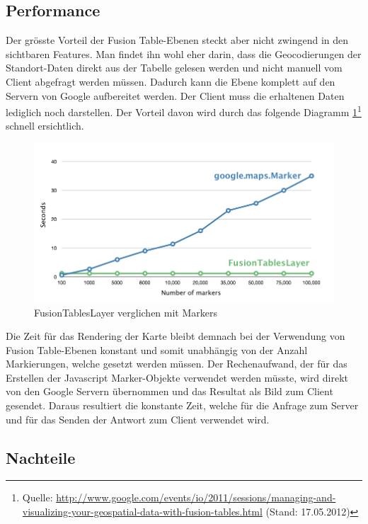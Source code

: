\subsection{Performance}
Der grösste Vorteil der Fusion Table-Ebenen steckt aber nicht zwingend in den sichtbaren Features. Man findet ihn wohl eher darin, dass die Geocodierungen der Standort-Daten direkt aus der Tabelle gelesen werden und nicht manuell vom Client abgefragt werden müssen. Dadurch kann die Ebene komplett auf den Servern von Google aufbereitet werden. Der Client muss die erhaltenen Daten lediglich noch darstellen. Der Vorteil davon wird durch das folgende Diagramm \ref{fusiontableslayer-compare_markers}\footnote{Quelle: \url{http://www.google.com/events/io/2011/sessions/managing-and-visualizing-your-geospatial-data-with-fusion-tables.html} (Stand: 17.05.2012)} schnell ersichtlich.

\begin{figure}[!h]
	\centering
	\includegraphics[scale=0.5]{images/gmap_fusiontableslayer_vs_markers.png}
	\caption{FusionTablesLayer verglichen mit Markers}
	\label{fusiontableslayer-compare_markers}
\end{figure}

Die Zeit für das Rendering der Karte bleibt demnach bei der Verwendung von Fusion Table-Ebenen konstant und somit unabhängig von der Anzahl Markierungen, welche gesetzt werden müssen. Der Rechenaufwand, der für das Erstellen der Javascript Marker-Objekte verwendet werden müsste, wird direkt von den Google Servern übernommen und das Resultat als Bild zum Client gesendet. Daraus resultiert die konstante Zeit, welche für die Anfrage zum Server und für das Senden der Antwort zum Client verwendet wird.

\subsection{Nachteile}

